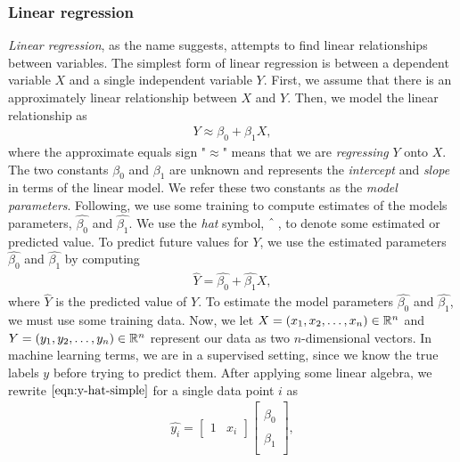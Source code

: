 \subsubsection{Linear regression}
\label{sec:linear-regression}
\textit{Linear regression}, as the name suggests, attempts to find linear relationships between variables. The simplest form of linear regression is between a dependent variable $X$ and a single independent variable $Y$. First, we assume that there is an approximately linear relationship between $X$ and $Y$. Then, we model the linear relationship as
\begin{align}
    Y \approx \beta_0 + \beta_1 X,
\end{align}
where the approximate equals sign "$\approx$" means that we are \textit{regressing} $Y$ onto $X$. The two constants $\beta_0$ and $\beta_1$ are unknown and represents the \textit{intercept} and \textit{slope} in terms of the linear model. We refer these two constants as the \textit{model parameters}. Following, we use some training to compute estimates of the models parameters, $\hat{\beta_0}$ and $\hat{\beta_1}$. We use the \textit{hat} symbol, $\string^$\,, to denote some estimated or predicted value. To predict future values for $Y$, we use the estimated parameters $\hat{\beta_0}$ and $\hat{\beta_1}$ by computing
\begin{align}
    \hat{Y} = \hat{\beta_0} + \hat{\beta_1}X,
    \label{eqn:y-hat-simple}
\end{align}
where $\hat{Y}$ is the predicted value of $Y$. To estimate the model parameters $\hat{\beta_0}$ and $\hat{\beta_1}$, we must use some training data. Now, we let $X = (x_1, x_2, \ldots, x_n) \in \mathbb{R}^n$ and $Y = (y_1, y_2, \ldots, y_n) \in \mathbb{R}^n$ represent our data as two $n$-dimensional vectors. In machine learning terms, we are in a supervised setting, since we know the true labels $y$ before trying to predict them. After applying some linear algebra, we rewrite $\cref{eqn:y-hat-simple}$ for a single data point $i$ as
\begin{align}
    \hat{y_i} =
        \begin{bmatrix}
            1 & x_i
        \end{bmatrix}
        \begin{bmatrix}
            \hat{\beta}_0 \\
            \hat{\beta}_1 \\
        \end{bmatrix},
    \label{eqn:y-hat-two-matrix-form-single-point}
\end{align}
